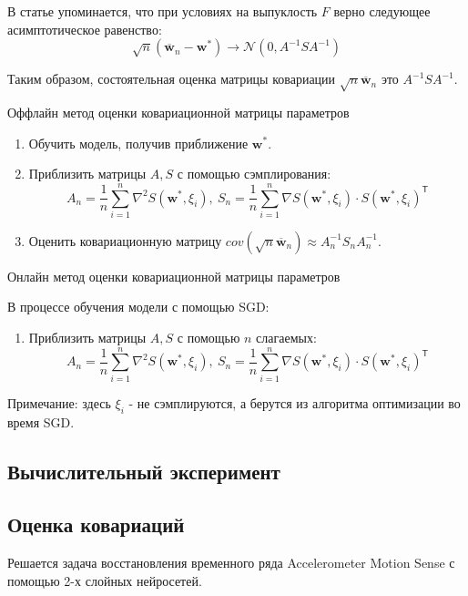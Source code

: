 \documentclass[12pt, twoside]{article}
\begin{document}
В статье упоминается, что при условиях на выпуклость $F$ верно следующее асимптотическое равенство:
$$
\sqrt{n}(\overline{\mathbf{w}}_n - \mathbf{w}^*) \to \mathcal{N}(0, A^{-1}SA^{-1})
$$

Таким образом, состоятельная оценка матрицы ковариации $\sqrt{n}\overline{\mathbf{w}}_n$ это $A^{-1}SA^{-1}$.

\begin{algorithm}[H] 
         \caption{Оффлайн метод оценки ковариационной матрицы параметров}\label{alg:offline_cov} 
         \begin{enumerate}
             \item Обучить модель, получив приближение $\mathbf{w}^*$.
             \item Приблизить матрицы $A, S$ с помощью сэмплирования:
             $$
             A_n = \frac{1}{n}\sum\limits_{i=1}^n\nabla^2S(\mathbf{w}^*, \xi_i), \ 
             S_n = \frac{1}{n}\sum\limits_{i=1}^n\nabla S(\mathbf{w}^*, \xi_i) \cdot S(\mathbf{w}^*, \xi_i)^{\mathsf{T}}
             $$
             \item Оценить ковариационную матрицу $cov(\sqrt{n}\overline{\mathbf{w}}_n) \approx A_n^{-1}S_nA_n^{-1}$.
         \end{enumerate}
 \end{algorithm}

 \begin{algorithm}[H] 
         \caption{Онлайн метод оценки ковариационной матрицы параметров}\label{alg:online_cov} 
         В процессе обучения модели с помощью SGD:
         \begin{enumerate}
             \item Приблизить матрицы $A, S$ с помощью $n$ слагаемых:
             $$
             A_n = \frac{1}{n}\sum\limits_{i=1}^n\nabla^2S(\mathbf{w}^*, \xi_i), \ 
             S_n = \frac{1}{n}\sum\limits_{i=1}^n\nabla S(\mathbf{w}^*, \xi_i) \cdot S(\mathbf{w}^*, \xi_i)^{\mathsf{T}}
             $$
         \end{enumerate}
         Примечание: здесь $\xi_i$ - не сэмплируются, а берутся из алгоритма оптимизации во время SGD.
 \end{algorithm}

 \subsection{Вычислительный эксперимент} 

\subsection{Оценка ковариаций}
 Решается задача восстановления временного ряда Accelerometer Motion Sense с помощью 2-х слойных нейросетей.
\end{document}
